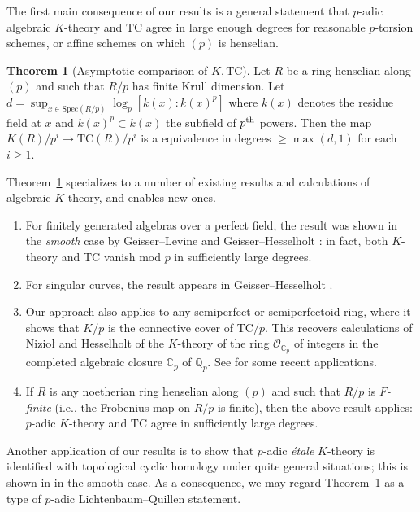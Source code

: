 \documentclass{amsart}
\newcommand{\spec}{\mathrm{Spec}}
\theoremstyle{definition}
\newtheorem{thm}{Theorem}
\newcommand{\sub}[1]{{\mbox{\rm \scriptsize #1}}}
\newcommand{\TC}{\mathrm{TC}}
\begin{document}
The first main consequence 
of our results is a general statement that $p$-adic algebraic $K$-theory and
$\TC$ agree in large enough degrees for reasonable $p$-torsion schemes, or
affine schemes on which $(p)$ is henselian. 

\begin{thm}[Asymptotic comparison of $K, \TC$] 
\label{KTCinlarge}
Let $R$ be a ring  henselian along $(p)$ and such that $R/p$ has finite Krull
dimension. 
Let $d = \sup_{x \in \spec (R/p) } \log_p [k(x):
k(x)^p]$ where $k(x)$ denotes the residue field at $x$ and $k(x)^p \subset
k(x)$ the subfield of $p^\sub{th}$ powers. Then 
the map $K(R)/p^i \to \TC(R)/p^i$ is a equivalence in degrees $\geq
\max(d, 1)$ for each $i \geq 1$. 
\end{thm} 
	
Theorem~\ref{KTCinlarge} specializes to a number of existing results and calculations of algebraic
$K$-theory, and enables new ones. 
\begin{enumerate}
\item  
For finitely generated algebras over a perfect field, the result was shown in
the \emph{smooth} case by Geisser--Levine \cite{GL} and Geisser--Hesselholt \cite{GH}:
in fact, both $K$-theory and TC vanish mod $p$ in sufficiently large degrees.
\item
For singular curves, the
result appears in Geisser--Hesselholt \cite{GHexc}. 
\item 
Our approach also applies to any
semiperfect or semiperfectoid ring, where it shows that $K/p$ is the connective cover of $\TC/p$.  This recovers calculations of
Nizio\l \cite{Niziol-crystalline} and Hesselholt \cite{HesselholtOC} of the $K$-theory of the ring 
$\mathcal{O}_{\mathbb{C}_p}$ of integers in the completed algebraic closure
$\mathbb{C}_p$ of $\mathbb{Q}_p$. See \cite[Sec.~7.4]{BMS2} for some recent
applications. 
\item If $R$ is any noetherian ring  henselian along $(p)$ and such that
$R/p$ is \emph{$F$-finite} (i.e., the Frobenius map on $R/p$
is finite), then the above result applies: $p$-adic $K$-theory and $\TC$ agree
in sufficiently large degrees. 
\end{enumerate}

Another application of our results is to show that $p$-adic \emph{\'etale} $K$-theory
is identified with topological cyclic homology under quite general situations;
this is shown in \cite{GH} in the smooth case. 
As a consequence, we may regard Theorem~\ref{KTCinlarge} as a type of $p$-adic
Lichtenbaum--Quillen statement. 
\end{document}
